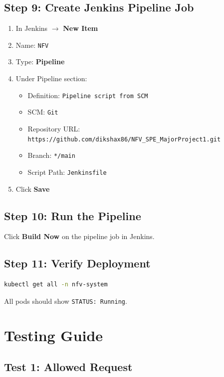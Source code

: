 \documentclass[12pt,a4paper]{article}
\begin{document}
\subsection{Step 9: Create Jenkins Pipeline Job}

\begin{enumerate}
    \item In Jenkins $\rightarrow$ \textbf{New Item}
    \item Name: \texttt{NFV}
    \item Type: \textbf{Pipeline}
    \item Under Pipeline section:
    \begin{itemize}
        \item Definition: \texttt{Pipeline script from SCM}
        \item SCM: \texttt{Git}
        \item Repository URL: \texttt{https://github.com/dikshax86/NFV\_SPE\_MajorProject1.git}
        \item Branch: \texttt{*/main}
        \item Script Path: \texttt{Jenkinsfile}
    \end{itemize}
    \item Click \textbf{Save}
\end{enumerate}

\subsection{Step 10: Run the Pipeline}

Click \textbf{Build Now} on the pipeline job in Jenkins.

\subsection{Step 11: Verify Deployment}

\begin{lstlisting}[language=bash]
kubectl get all -n nfv-system
\end{lstlisting}

All pods should show \texttt{STATUS: Running}.

\section{Testing Guide}

\subsection{Test 1: Allowed Request}
\end{document}
